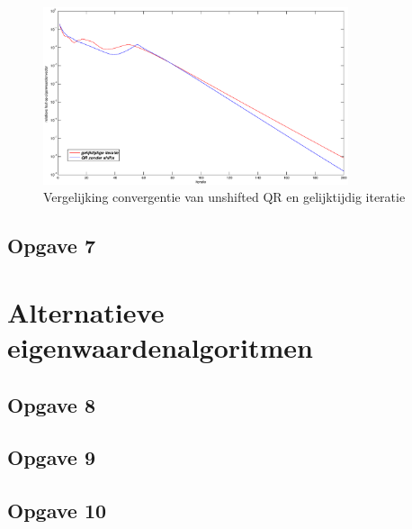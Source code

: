 \documentclass[a4paper, 12pt, titlepage]{report}
\begin{document}
\begin{figure}[htb]
	\centering
	\includegraphics[width=0.8\textwidth]{vergelijkingLineair.eps}
	\caption{Vergelijking convergentie van unshifted QR en gelijktijdig iteratie}
	\label{vglSimQR}
\end{figure}


\subsection{Opgave 7}

\section{Alternatieve eigenwaardenalgoritmen}

\subsection{Opgave 8}

\subsection{Opgave 9}

\subsection{Opgave 10}
\end{document}
